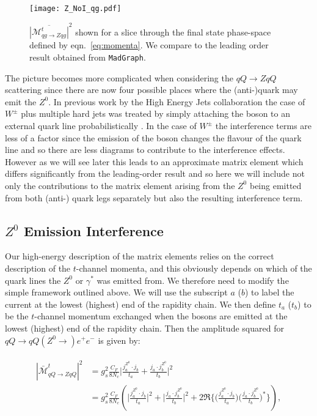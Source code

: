 		\begin{figure}[hbt]
			\centering
			\texttt{[image: Z\_NoI\_qg.pdf]}
			\caption{$\overline{|\mathcal{M}_{qg\to Zqg}^{t}|}^2$ shown for a slice through the
			final state phase-space defined by eqn.~\eqref{eq:momenta}.  We compare to the
			leading order result obtained from \texttt{MadGraph}.}
			\label{fig:ZatLO}
		\end{figure}

		The picture becomes more complicated when considering the $qQ\to ZqQ$ scattering since
		there are now four possible places where the (anti-)quark may emit
		the $Z^0$.  In previous work by the High Energy Jets collaboration the case of
		$W^\pm$ plus multiple hard jets was treated by simply attaching the boson to an external
		quark line probabilistically \cite{Andersen:2012gk}.  In the case of $W^\pm$ the interference
		terms are less of a factor since the emission of the boson changes the flavour of the quark
		line and so there are less diagrams to contribute to the interference effects.  However as
		we will see later this leads to an approximate matrix element which differs significantly from
		the leading-order result and so here we will include not only the contributions to the matrix
		element arising from the $Z^0$ being emitted from both (anti-) quark legs separately but also
		the resulting interference term.

	\subsection{$Z^0$ Emission Interference}

		Our high-energy
		description of the matrix elements relies on the correct description of the
		$t$-channel momenta, and this obviously depends on which of the quark lines
		the $Z^0$ or $\gamma^*$ was emitted from.  We therefore need to modify the simple
		framework outlined above.  We will use the subscript $a$ ($b$) to label the
		current at the lowest (highest) end of the rapidity chain.  We then define $t_a$
		($t_b$) to be the $t$-channel momentum exchanged when the bosons are emitted at
		the lowest (highest) end of the rapidity chain.  Then the amplitude squared
		for $qQ\to qQ(Z^0\to) e^+ e^-$ is given by:

		\begin{align}
		\begin{split}
			{|\bar{\mathcal{M}}_{qQ\to ZqQ}^{t}|}^2 &= g_s^2 \frac{C_F}{8N_c}
			\Big|\frac{j^{Z^0}_a\cdot j_b}{t_a} + \frac{j_a\cdot
			j^{Z^0}_b}{t_b}\Big|^2\\
			&= g_s^2 \frac{C_F}{8N_c} \left( \Big|\frac{j^{Z^0}_a\cdot j_b}{t_a}\Big|^2 + \Big|\frac{j_a\cdot
			j^{Z^0}_b}{t_b}\Big|^2 + 2\Re{\Big\{\Big(\frac{j^{Z^0}_a\cdot
			j_b}{t_a}\Big)\Big(\frac{j_a\cdot j^{Z^0}_b}{t_b}\Big)^*\Big\}} \right),
			\label{eqn:interference}
		\end{split}
		\end{align}

